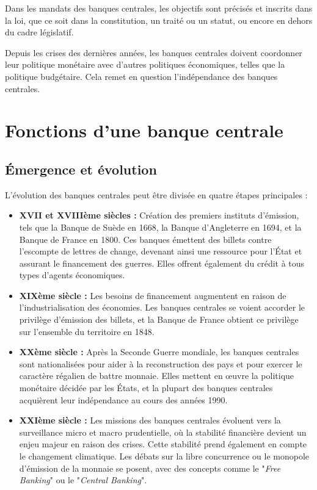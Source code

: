 \documentclass[a4paper, 12pt]{report}
\begin{document}
Dans les mandats des banques centrales, les objectifs sont précisés et inscrits dans la loi, que ce soit dans la constitution, un traité ou un statut, ou encore en dehors du cadre législatif. 

Depuis les crises des dernières années, les banques centrales doivent coordonner leur politique monétaire avec d'autres politiques économiques, telles que la politique budgétaire. Cela remet en question l'indépendance des banques centrales.

\section{Fonctions d'une banque centrale}


\subsection{Émergence et évolution}

L'évolution des banques centrales peut être divisée en quatre étapes principales :

\begin{itemize}
	\item \textbf{XVII et XVIIIème siècles :} Création des premiers instituts d'émission, tels que la Banque de Suède en 1668, la Banque d'Angleterre en 1694, et la Banque de France en 1800. Ces banques émettent des billets contre l'escompte de lettres de change, devenant ainsi une ressource pour l'État et assurant le financement des guerres. Elles offrent également du crédit à tous types d'agents économiques.
	
	\item \textbf{XIXème siècle :} Les besoins de financement augmentent en raison de l'industrialisation des économies. Les banques centrales se voient accorder le privilège d'émission des billets, et la Banque de France obtient ce privilège sur l'ensemble du territoire en 1848.
	
	\item \textbf{XXème siècle :} Après la Seconde Guerre mondiale, les banques centrales sont nationalisées pour aider à la reconstruction des pays et pour exercer le caractère régalien de battre monnaie. Elles mettent en œuvre la politique monétaire décidée par les États, et la plupart des banques centrales acquièrent leur indépendance au cours des années 1990.
	
	\item \textbf{XXIème siècle :} Les missions des banques centrales évoluent vers la surveillance micro et macro prudentielle, où la stabilité financière devient un enjeu majeur en raison des crises. Cette stabilité prend également en compte le changement climatique. Les débats sur la libre concurrence ou le monopole d'émission de la monnaie se posent, avec des concepts comme le "\textit{Free Banking}" ou le "\textit{Central Banking}".
\end{itemize}
\end{document}

